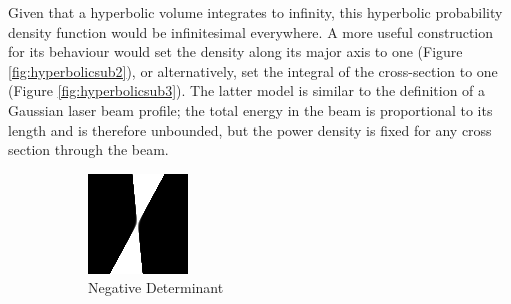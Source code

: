 \documentclass[a4paper, 11pt, titlepage]{article}
\begin{document}
        Given that a hyperbolic volume integrates to infinity, this hyperbolic probability density function would be infinitesimal everywhere.  A more useful construction for its behaviour would set the density along its major axis to one (Figure \ref{fig:hyperbolicsub2}), or alternatively, set the integral of the cross-section to one (Figure \ref{fig:hyperbolicsub3}).
        The latter model is similar to the definition of a Gaussian laser beam profile; the total energy in the beam is proportional to its length and is therefore unbounded, but the power density is fixed for any cross section through the beam.
        \begin{figure}
        \centering
        \begin{subfigure}{.33\textwidth}
          \centering
          \includegraphics[width=.9\linewidth]{images/GaussianRay1.png}
          \caption{Negative Determinant}
          \label{fig:hyperbolicsub1}
        \end{subfigure}%
        \begin{subfigure}{.33\textwidth}
          \centering

\end{subfigure}
\end{figure}
\end{document}
